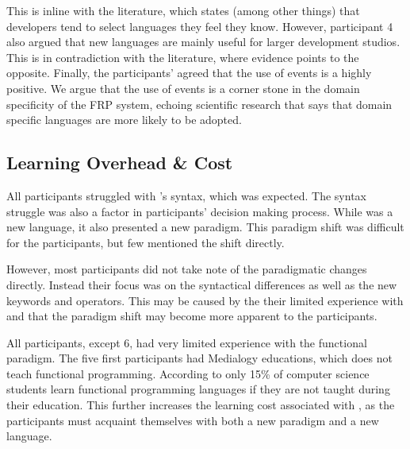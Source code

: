 This is inline with the literature, which states (among other things) that developers tend to select languages they feel they know\cite{meyerovich2013empirical}. However, participant 4 also argued that new languages are mainly useful for larger development studios. This is in contradiction with the literature, where evidence points to the opposite. Finally, the participants' agreed that the use of events is a highly positive. We argue that the use of events is a corner stone in the domain specificity of the \gls{FRP} system, echoing scientific research that says that domain specific languages are more likely to be adopted\cite{meyerovich2013empirical}.

\subsection{Learning Overhead \& Cost}
All participants struggled with \fs's syntax, which was expected. The syntax struggle was also a factor in participants' decision making process. While \fs was a new language, it also presented a new paradigm. This paradigm shift was difficult for the participants, but few mentioned the shift directly.


However, most participants did not take note of the paradigmatic changes directly. Instead their focus was on the syntactical differences as well as the new keywords and operators. This may be caused by the their limited experience with \fs and that the paradigm shift may become more apparent to the participants.



All participants, except 6, had very limited experience with the functional paradigm. The five first participants had Medialogy educations, which does not teach functional programming. According to \cite{meyerovich2013empirical} only 15\% of computer science students learn functional programming languages if they are not taught during their education. This further increases the learning cost associated with \fs, as the participants must acquaint themselves with both a new paradigm and a new language.


